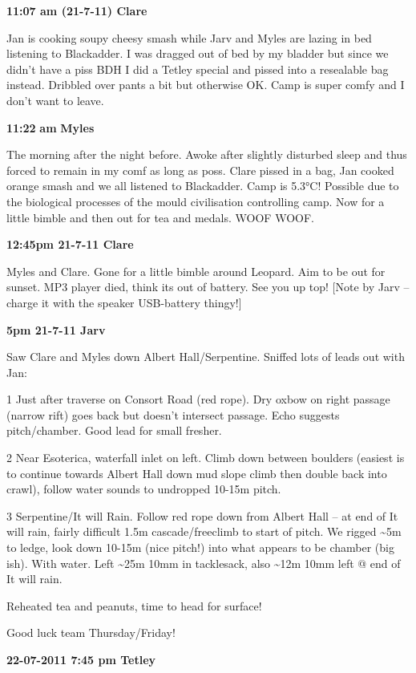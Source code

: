 \textbf{11:07 am (21-7-11) Clare}

Jan is cooking soupy cheesy smash while Jarv and Myles are lazing in bed
listening to Blackadder. I was dragged out of bed by my bladder but
since we didn't have a piss BDH I did a Tetley special and pissed into a
resealable bag instead. Dribbled over pants a bit but otherwise OK. Camp
is super comfy and I don't want to leave.

\textbf{11:22} \textbf{am} \textbf{Myles}

The morning after the night before. Awoke after slightly disturbed sleep
and thus forced to remain in my comf as long as poss. Clare pissed in a
bag, Jan cooked orange smash and we all listened to Blackadder. Camp is
5.3°C! Possible due to the biological processes of the mould
civilisation controlling camp. Now for a little bimble and then out for
tea and medals. WOOF WOOF.

\textbf{12:45pm 21-7-11 Clare}

Myles and Clare. Gone for a little bimble around Leopard. Aim to be out
for sunset. MP3 player died, think its out of battery. See you up top!
{[}Note by Jarv -- charge it with the speaker USB-battery thingy!{]}

\textbf{5pm 21-7-11 Jarv}

Saw Clare and Myles down Albert Hall/Serpentine. Sniffed lots of leads
out with Jan:

1 Just after traverse on Consort Road (red rope). Dry oxbow on right
passage (narrow rift) goes back but doesn't intersect passage. Echo
suggests pitch/chamber. Good lead for small fresher.

2 Near Esoterica, waterfall inlet on left. Climb down between boulders
(easiest is to continue towards Albert Hall down mud slope climb then
double back into crawl), follow water sounds to undropped 10-15m pitch.

3 Serpentine/It will Rain. Follow red rope down from Albert Hall -- at
end of It will rain, fairly difficult 1.5m cascade/freeclimb to start of
pitch. We rigged \textasciitilde{}5m to ledge, look down 10-15m (nice
pitch!) into what appears to be chamber (big ish). With water. Left
\textasciitilde{}25m 10mm in tacklesack, also \textasciitilde{}12m 10mm
left @ end of It will rain.

Reheated tea and peanuts, time to head for surface!

Good luck team Thursday/Friday!

\textbf{22-07-2011 7:45 pm Tetley}

